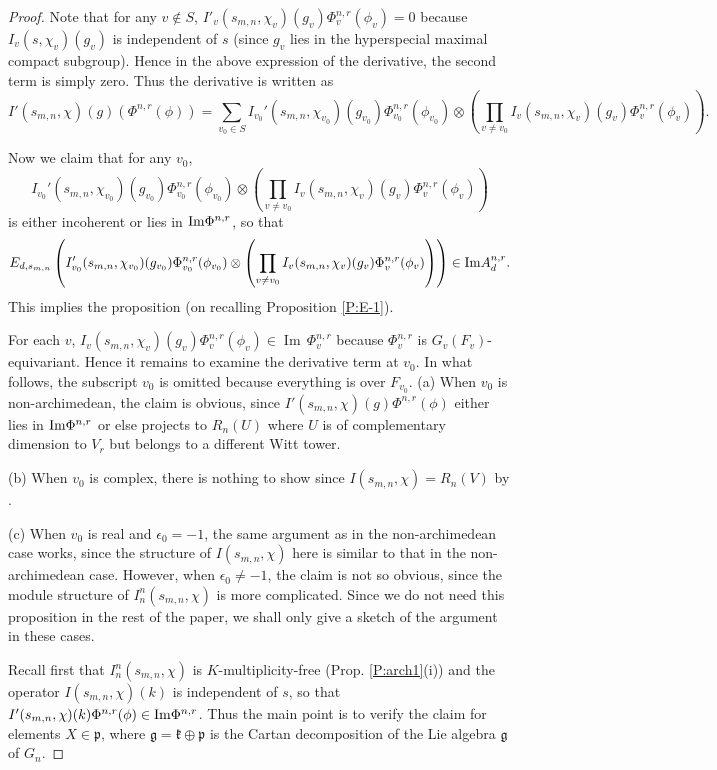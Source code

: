 \documentclass[10pt]{amsart}
\theoremstyle{plain}
\numberwithin{equation}{section}
\begin{document}
\begin{proof}
Note that for any $v\notin S$, $I'_v(s_{m,n},
\chi_v)(g_v)\Phi_v^{n,r}(\phi_v)=0$ because $I_v(s, \chi_v)(g_v)$ is independent of $s$ (since $g_v$ lies in the hyperspecial maximal compact subgroup). Hence in the above expression of the derivative, the second
term is simply zero. Thus the derivative is written as
\[
I'(s_{m,n},\chi)(g)\left( \Phi^{n,r}(\phi)\right)
=\sum_{v_0\in S}I_{v_0}'(s_{m,n}, \chi_{v_0})(g_{v_0}) \Phi_{v_0}^{n,r}(\phi_{v_0})
\otimes  \left( \prod_{v \ne v_0}  I_v(s_{m,n}, \chi_v)(g_v)
  \Phi_v^{n,r}(\phi_v) \right).
\]

Now we claim that for any $v_0$,
 \[   I_{v_0}'(s_{m,n}, \chi_{v_0})(g_{v_0})
 \Phi_{v_0}^{n,r}(\phi_{v_0})  \otimes \left( \prod_{v \ne v_0}
   I_v(s_{m,n}, \chi_v)(g_v) \Phi_v^{n,r}(\phi_v) \right) \]
is either incoherent or lies in ${\rm Im} \Phi^{n,r}$, so that
\[  E_{d, s_{m,n}}\left(I_{v_0}'(s_{m,n}, \chi_{v_0})(g_{v_0})
  \Phi_{v_0}^{n,r}(\phi_{v_0}) \otimes \left( \prod_{v \ne v_0}
    I_v(s_{m,n}, \chi_v)(g_v) \Phi_v^{n,r}(\phi_v) \right)  \right) \in
{\rm Im} A_{d}^{n,r}. \]
This implies the proposition
(on recalling  Proposition \ref{P:E-1}).
\vskip 5pt

For each $v$, $I_v(s_{m,n}, \chi_v)(g_v)
\Phi_v^{n,r}(\phi_v)\in{\operatorname{Im\,}}\Phi_v^{n,r}$ because $\Phi_v^{n,r}$ is
$G_v(F_v)$-equivariant. Hence it remains to examine the derivative term at $v_0$.
 In what follows,
the subscript $v_0$ is omitted because everything is over $F_{v_0}$.
\vskip 5pt
\noindent (a) When $v_0$ is non-archimedean, the claim is obvious,
since  $ I'(s_{m,n}, \chi)(g)
\Phi^{n,r}(\phi)$  either  lies in ${\rm Im}
\Phi^{n,r}$ or else projects to $R_n(U)$ where $U$ is of
complementary dimension to $V_r$ but belongs to a different Witt
tower. 

\vskip 5pt

\noindent (b) When $v_0$ is complex, there is nothing to show since
$I(s_{m,n}, \chi)  = R_n(V)$ by \cite{LZ3}.
\vskip 5pt

\noindent (c)  When    $v_0$ is real and $\epsilon_0 = -1$, the same
argument as in the non-archimedean case works, since the structure of
$I(s_{m,n},\chi)$ here is similar to that in the non-archimedean
case. However, when $\epsilon_ 0 \ne -1$,  
 the claim is not so obvious, since the module structure of
 $I^n_n(s_{m,n},\chi)$ is more complicated. Since we do not need this
 proposition in the rest of the paper, we shall only give a sketch of
 the argument in these cases.  
\vskip 5pt

Recall first that $I^n_n(s_{m,n} ,\chi)$ is $K$-multiplicity-free
(Prop. \ref{P:arch1}(i)) and the operator $I(s_{m,n}, \chi)(k)$ is
independent of $s$, so that $I'(s_{m,n}, \chi)(k) \Phi^{n,r}(\phi) \in
{\rm Im} \Phi^{n,r}$. Thus the main point is to verify the claim for
elements  $X \in \mathfrak{p}$, where $\mathfrak{g} = \mathfrak{k}
\oplus \mathfrak{p}$ is the Cartan decomposition of the Lie algebra
$\mathfrak{g}$ of $G_n$. 
\vskip 5pt


\end{proof}
\end{document}
